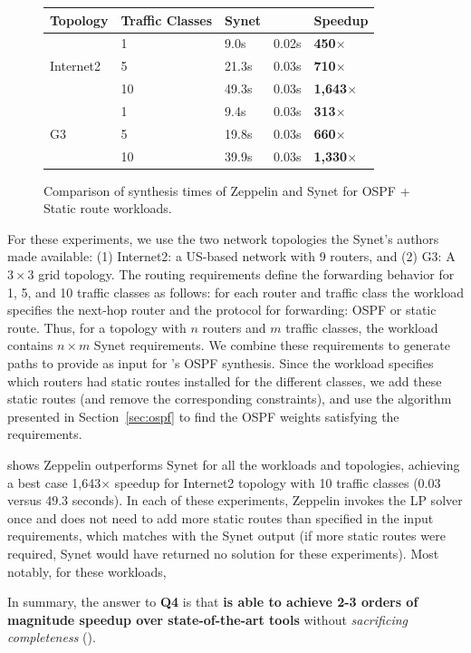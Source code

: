 \begin{figure}
	\small
		\begin{minipage}{\linewidth}
			\begin{tabular}{m{3.4em} m{2.8em} m{2.2em} m{3.1em} m{3.1em}} 
				{\bf Topology} & {\bf Traffic Classes} & {\bf Synet} & {\bf \name} & {\bf Speedup} \\ 
				\hline
				\multirow{3}{*}{Internet2}& 1 & 9.0s & 0.02s & \textbf{450$\times$} \\
				 & 5 & 21.3s &	0.03s &	\textbf{710$\times$} \\
				 & 10 & 49.3s &	0.03s &	\textbf{1,643$\times$} \\ 
				\hline 
				\multirow{3}{*}{G3} & 1 & 9.4s &	0.03s &	\textbf{313$\times$}\\
				 & 5 & 19.8s &	0.03s &  \textbf{660$\times$}\\
				& 10 & 39.9s	&  0.03s	& \textbf{1,330$\times$} \\ 
			\end{tabular}
		\end{minipage}
		\caption{
		Comparison of synthesis times of  
			Zeppelin and Synet for OSPF + Static route workloads.  }
		\label{tab:synetcomparison}
\end{figure}


For these experiments, we use the two network topologies the Synet's authors made 
available: (1) Internet2:
a US-based network with 9 routers, and (2) G3: A $3 \times 3$ grid
topology. The routing requirements define the forwarding behavior
for 1, 5, and 10 traffic classes as follows:
for each router and traffic class
the workload specifies the next-hop router and the protocol for 
forwarding: OSPF or static route. 
Thus, for a topology with $n$ routers and $m$ traffic classes, 
the workload contains $n \times m$ Synet requirements. 
We 
combine these requirements to generate paths to provide as input 
for \name's OSPF synthesis. Since the workload specifies which
routers had static routes installed for the different classes, we 
add these static routes (and remove the corresponding constraints), 
and use the algorithm presented in 
Section~\ref{sec:ospf}  to find the OSPF weights satisfying the 
requirements.

 shows Zeppelin outperforms Synet 
for all the workloads and topologies, achieving a best case 1,643$\times$
speedup 
 for Internet2 topology with 10 traffic classes 
(0.03 versus 49.3 seconds). In each of these experiments, Zeppelin 
invokes the LP solver once and does not need to add more static routes
than specified in the input requirements, which matches with the Synet 
output (if more static routes were required, Synet would have returned 
no solution for these experiments). 
Most notably,
for these workloads, 

In summary, the answer to \textbf{Q4} is that
\textbf{\name is 
able to achieve 2-3 orders of magnitude speedup over state-of-the-art tools}
without \emph{sacrificing 
completeness} ().